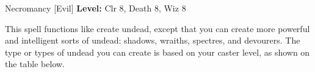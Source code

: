 {Necromancy [Evil]}
{
	\textbf{Level:}
	Clr 8, Death 8, Wiz 8\\
}
{
	This spell functions like create undead, except that you can create more powerful and intelligent sorts of undead: shadows, wraiths, spectres, and devourers. The type or types of undead you can create is based on your caster level, as shown on the table below.


}
